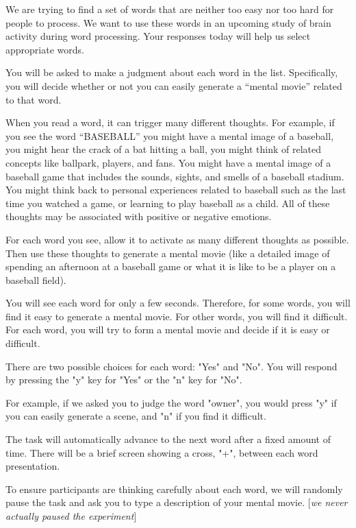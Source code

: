 \begin{displayquote}

We are trying to find a set of words that are neither too easy nor too hard for people to process. We want to use these words in an upcoming study of brain activity during word processing. Your responses today will help us select appropriate words.

You will be asked to make a judgment about each word in the list. Specifically, you will decide whether or not you can easily generate a ``mental movie'' related to that word.

When you read a word, it can trigger many different thoughts. For example, if you see the word ``BASEBALL'' you might have a mental image of a baseball, you might hear the crack of a bat hitting a ball, you might think of related concepts like ballpark, players, and fans. You might have a mental image of a baseball game that includes the sounds, sights, and smells of a baseball stadium. You might think back to personal experiences related to baseball such as the last time you watched a game, or learning to play baseball as a child. All of these thoughts may be associated with positive or negative emotions.

For each word you see, allow it to activate as many different thoughts as possible. Then use these thoughts to generate a mental movie (like a detailed image of spending an afternoon at a baseball game or what it is like to be a player on a baseball field). 

You will see each word for only a few seconds. Therefore, for some words, you will find it easy to generate a mental movie. For other words, you will find it difficult. For each word, you will try to form a mental movie and decide if it is easy or difficult. 

There are two possible choices for each word: "Yes" and "No". You will respond by pressing the "y" key for "Yes" or the "n" key for "No".

For example, if we asked you to judge the word "owner", you would press "y" if you can easily generate a scene, and "n" if you find it difficult.

The task will automatically advance to the next word after a fixed amount of time. There will be a brief screen showing a cross, "+", between each word presentation.

To ensure participants are thinking carefully about each word, we will randomly pause the task and ask you to type a description of your mental movie. [\emph{we never actually paused the experiment}]

\end{displayquote}

